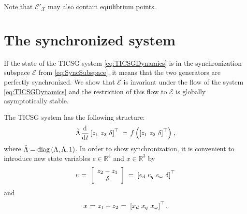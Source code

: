 \documentclass{ifacconf}
\newcommand{\rline}  {{\mathbb R}}
\renewcommand{\L}    {{\Lambda}}
\renewcommand{\o}    {{\omega}}
\newcommand{\m}      {{\hbox{\hskip 1pt}}}
\newcommand{\dd}     {{\rm d\hbox{\hskip 0.5pt}}}
\newcommand{\Emscr}  {{\mathcal{E}}}
\newcommand{\Xmscr}  {{\mathcal{X}}}
\begin{document}
Note that $\Emscr'_\Xmscr$ may also contain equilibrium points.

\section{The synchronized system} \label{sec5} %

If the state of the TICSG system \eqref{eq:TICSGDynamics} is in the
synchronization subspace $\Emscr$ from \eqref{eq:SyncSubspace}, it
means that the two generators are perfectly synchronized. We show that
$\Emscr$ is invariant under the flow of the system
\eqref{eq:TICSGDynamics} and the restriction of this flow to $\Emscr$
is globally asymptotically stable.

The TICSG system has the following structure: \vspace{-1mm}
$$ \tilde{\L}\m\frac{\dd}{\dd t}\left[z_1\ z_2\ \delta\right]^{\top}
   \m=\m f\left( \left[z_1\ z_2\ \delta\right]^{\top} \right) \m,$$
where $\tilde{\L}={\rm diag}\left(\L,\L,1\right)$. In order to show 
synchronization, it is convenient to introduce new 
state variables $e\in\rline^4$ and $x\in\rline^3$ by \vspace{-2mm}
$$ e \m=\m \left[ \begin{array}{c} z_2 - z_1\\ \delta \end{array} 
   \right] \m=\m \left[e_d\ e_q\ e_\o\ \delta \right]^\top$$
and \vspace{-2mm}
$$x \m=\m z_1+z_2 \m=\m \left[ x_d\ x_q\ x_\o\right]^\top .$$  
\end{document}
